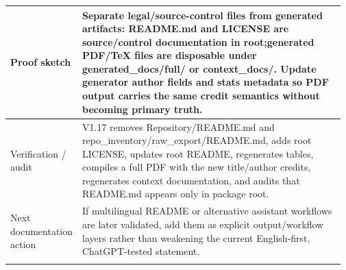 \begin{longtable}{L{0.16\linewidth} L{0.81\linewidth}}
\hline\addlinespace[0.20em]
Proof sketch & Separate legal/\allowbreak{}source-control files from generated artifacts: README.md and LICENSE are source/\allowbreak{}control documentation in root;\newline generated PDF/\allowbreak{}TeX files are disposable under generated\_docs/\allowbreak{}full/\allowbreak{} or context\_docs/\allowbreak{}. Update generator author fields and stats metadata so PDF output carries the same credit semantics without becoming primary truth.\\
\hline\addlinespace[0.20em]
Verification /\allowbreak{} audit & V1.17 removes Repository/\allowbreak{}README.md and repo\_inventory/\allowbreak{}raw\_export/\allowbreak{}README.md, adds root LICENSE, updates root README, regenerates tables, compiles a full PDF with the new title/\allowbreak{}author credits, regenerates context documentation, and audits that README.md appears only in package root.\\
\hline\addlinespace[0.20em]
Next documentation action & If multilingual README or alternative assistant workflows are later validated, add them as explicit output/\allowbreak{}workflow layers rather than weakening the current English-first, ChatGPT-tested statement.\\
\hline\addlinespace[0.20em]
\end{longtable}
